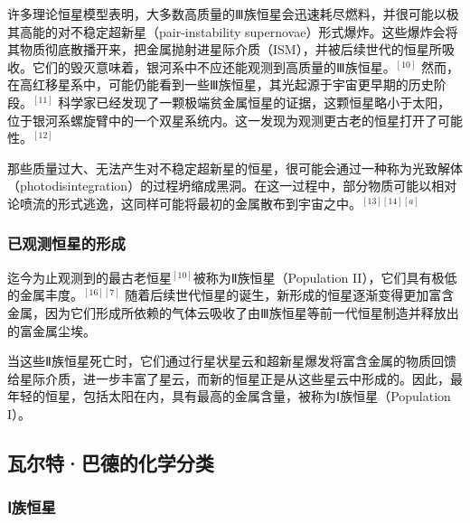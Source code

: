 许多理论恒星模型表明，大多数高质量的Ⅲ族恒星会迅速耗尽燃料，并很可能以极其高能的对不稳定超新星（pair-instability supernovae）形式爆炸。这些爆炸会将其物质彻底散播开来，把金属抛射进星际介质（ISM），并被后续世代的恒星所吸收。它们的毁灭意味着，银河系中不应还能观测到高质量的Ⅲ族恒星。$^{[10]}$ 然而，在高红移星系中，可能仍能看到一些Ⅲ族恒星，其光起源于宇宙更早期的历史阶段。$^{[11]}$ 科学家已经发现了一颗极端贫金属恒星的证据，这颗恒星略小于太阳，位于银河系螺旋臂中的一个双星系统内。这一发现为观测更古老的恒星打开了可能性。$^{[12]}$

那些质量过大、无法产生对不稳定超新星的恒星，很可能会通过一种称为光致解体（photodisintegration）的过程坍缩成黑洞。在这一过程中，部分物质可能以相对论喷流的形式逃逸，这同样可能将最初的金属散布到宇宙之中。$^{[13][14][a]}$
\subsubsection{已观测恒星的形成}
迄今为止观测到的最古老恒星$^{[10]}$被称为Ⅱ族恒星（Population II），它们具有极低的金属丰度。$^{[16][7]}$ 随着后续世代恒星的诞生，新形成的恒星逐渐变得更加富含金属，因为它们形成所依赖的气体云吸收了由Ⅲ族恒星等前一代恒星制造并释放出的富金属尘埃。

当这些Ⅱ族恒星死亡时，它们通过行星状星云和超新星爆发将富含金属的物质回馈给星际介质，进一步丰富了星云，而新的恒星正是从这些星云中形成的。因此，最年轻的恒星，包括太阳在内，具有最高的金属含量，被称为Ⅰ族恒星（Population I）。
\subsection{瓦尔特·巴德的化学分类}
\subsubsection{Ⅰ族恒星}
